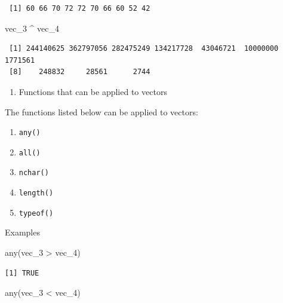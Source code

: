 \documentclass[
  letterpaper,
  DIV=11,
  numbers=noendperiod]{scrreprt}
\newenvironment{Shaded}{\begin{snugshade}}{\end{snugshade}}
\newcommand{\FunctionTok}[1]{\textcolor[rgb]{0.28,0.35,0.67}{#1}}
\newcommand{\NormalTok}[1]{\textcolor[rgb]{0.00,0.23,0.31}{#1}}
\newcommand{\SpecialCharTok}[1]{\textcolor[rgb]{0.37,0.37,0.37}{#1}}
\providecommand{\tightlist}{%
  \setlength{\itemsep}{0pt}\setlength{\parskip}{0pt}}\usepackage{longtable,booktabs,array}
\begin{document}
\begin{verbatim}
 [1] 60 66 70 72 72 70 66 60 52 42
\end{verbatim}

\begin{Shaded}
\begin{Highlighting}[]
\NormalTok{vec\_3 }\SpecialCharTok{\^{}}\NormalTok{ vec\_4}
\end{Highlighting}
\end{Shaded}

\begin{verbatim}
 [1] 244140625 362797056 282475249 134217728  43046721  10000000   1771561
 [8]    248832     28561      2744
\end{verbatim}

\begin{enumerate}
\def\labelenumi{\arabic{enumi}.}
\setcounter{enumi}{2}
\tightlist
\item
  Functions that can be applied to vectors
\end{enumerate}

The functions listed below can be applied to vectors:

\begin{enumerate}
\def\labelenumi{\alph{enumi}.}
\item
  \texttt{any()}
\item
  \texttt{all()}
\item
  \texttt{nchar()}
\item
  \texttt{length()}
\item
  \texttt{typeof()}
\end{enumerate}

Examples

\begin{Shaded}
\begin{Highlighting}[]
\FunctionTok{any}\NormalTok{(vec\_3 }\SpecialCharTok{\textgreater{}}\NormalTok{ vec\_4)}
\end{Highlighting}
\end{Shaded}

\begin{verbatim}
[1] TRUE
\end{verbatim}

\begin{Shaded}
\begin{Highlighting}[]
\FunctionTok{any}\NormalTok{(vec\_3 }\SpecialCharTok{\textless{}}\NormalTok{ vec\_4)}
\end{Highlighting}
\end{Shaded}
\end{document}
